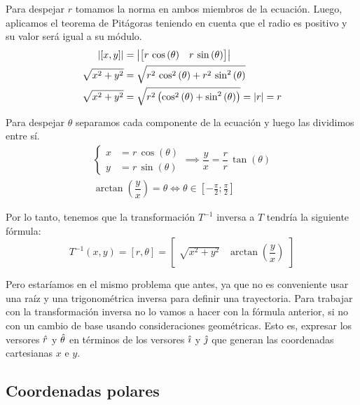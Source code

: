 Para despejar $r$ tomamos la norma en ambos miembros de la ecuación.
Luego, aplicamos el teorema de Pitágoras teniendo en cuenta que el radio es positivo y su valor será igual a su módulo.
\begin{align*}
  {\left| {[x,y]} \right|} &= {\left| {\begin{bmatrix} r \, \cos{(\theta)} & r \, \sin{(\theta)} \end{bmatrix}} \right|}
  \\
  \sqrt{x^2 + y^2} &= \sqrt{r^2 \, \cos^2{(\theta)} + r^2 \, \sin^2{(\theta)}}
  \\
  \sqrt{x^2 + y^2} &= \sqrt{r^2 \left( \cos^2{(\theta)} + \sin^2{(\theta)} \right)} = |r| = r
\end{align*}

Para despejar $\theta$ separamos cada componente de la ecuación y luego las dividimos entre sí.
\begin{gather*}
  \left\{
    \begin{aligned}
      x &= r \, \cos{(\theta)}
      \\
      y &= r \, \sin{(\theta)}
    \end{aligned}
  \right.
  \implies
  \dfrac{y}{x} = \dfrac{r}{r} \, \tan{(\theta)}
  \\
  \arctan{\left( \dfrac{y}{x} \right)} = \theta \iff \theta \in \left[ -\tfrac{\pi}{2};\tfrac{\pi}{2} \right]
\end{gather*}

Por lo tanto, tenemos que la transformación $T^{-1}$ inversa a $T$ tendría la siguiente fórmula:
\[
  T^{-1} (x,y) = [r,\theta] =
  \begin{bmatrix}
      \sqrt{x^2 + y^2} & \arctan{\left( \dfrac{y}{x} \right)} 
  \end{bmatrix}
\]

Pero estaríamos en el mismo problema que antes, ya que no es conveniente usar una raíz y una trigonométrica inversa para definir una trayectoria.
Para trabajar con la transformación inversa no lo vamos a hacer con la fórmula anterior, si no con un cambio de base usando consideraciones geométricas.
Esto es, expresar los versores $\hat{r}$ y $\hat{\theta}$ en términos de los versores $\hat{\imath}$ y $\hat{\jmath}$ que generan las coordenadas cartesianas $x$ e $y$.

\subsection{Coordenadas polares}
\label{A:polarCoordinates}

